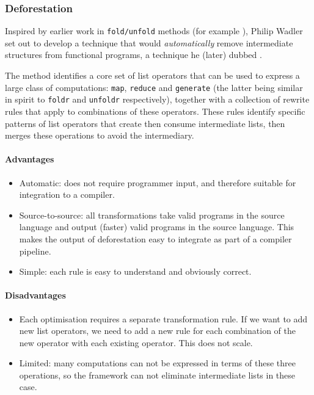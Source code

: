 \subsubsection{Deforestation}

Inspired by earlier work in \texttt{fold/unfold} methods (for example
\citet{Burstall:1977kl}), Philip Wadler set out to develop a technique that
would \emph{automatically} remove intermediate structures from functional
programs, a technique he (later) dubbed 
\cite{Wadler:1981hy,Wadler:1990ix}.

The method identifies a core set of list operators that can be used to express a
large class of computations: \texttt{map}, \texttt{reduce} and
\texttt{generate} (the latter being similar in spirit to \texttt{foldr} and
\texttt{unfoldr} respectively), together with a collection of rewrite rules that
apply to combinations of these operators. These rules identify specific patterns
of list operators that create then consume intermediate lists, then merges these
operations to avoid the intermediary.

\paragraph{Advantages}
\begin{itemize}
    \item Automatic: does not require programmer input, and therefore suitable
        for integration to a compiler.

    \item Source-to-source: all transformations take valid programs in the
        source language and output (faster) valid programs in the source
        language. This makes the output of deforestation easy to integrate as
        part of a compiler pipeline.

    \item Simple: each rule is easy to understand and obviously correct.
\end{itemize}

\paragraph{Disadvantages}
\begin{itemize}
    \item Each optimisation requires a separate transformation rule. If we want
        to add new list operators, we need to add a new rule for each
        combination of the new operator with each existing operator. This does
        not scale.

    \item Limited: many computations can not be expressed in terms of these
        three operations, so the framework can not eliminate intermediate lists
        in these case. 
\end{itemize}


